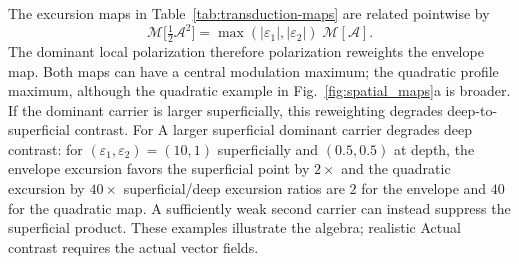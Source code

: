 \documentclass[11pt,a4paper]{article}
\providecommand{\DIFaddtex}[1]{{\protect\color{blue} \sf #1}} %
\providecommand{\DIFdeltex}[1]{{\protect\color{red} \scriptsize #1}} %
\providecommand{\DIFaddbegin}{} %
\providecommand{\DIFaddend}{} %
\providecommand{\DIFdelbegin}{} %
\providecommand{\DIFdelend}{} %
\providecommand{\DIFadd}[1]{\texorpdfstring{\DIFaddtex{#1}}{#1}} %
\providecommand{\DIFdel}[1]{\texorpdfstring{\DIFdeltex{#1}}{}} %
\begin{document}
The excursion maps in Table~\ref{tab:transduction-maps} are related pointwise by
\begin{equation}
\mathcal{M}\big[\tfrac12\mathcal A^2\big]=\max(|\varepsilon_1|,|\varepsilon_2|)\;\mathcal{M}[\mathcal A].
\label{eq:reweight}
\end{equation}
The dominant \DIFdelbegin \DIFdel{local polarization therefore }\DIFdelend \DIFaddbegin \DIFadd{polarization }\DIFaddend reweights the envelope map. Both maps can have a
central \DIFdelbegin \DIFdel{modulation maximum; the quadratic profile }\DIFdelend \DIFaddbegin \DIFadd{maximum, although the quadratic example }\DIFaddend in Fig.~\ref{fig:spatial_maps}a
is broader. \DIFdelbegin \DIFdel{If the dominant carrier is larger
superficially, this reweighting degrades deep-to-superficial contrast. For
}\DIFdelend \DIFaddbegin \DIFadd{A larger superficial dominant carrier degrades deep contrast:
for }\DIFaddend $(\varepsilon_1,\varepsilon_2)=(10,1)$ superficially and $(0.5,0.5)$
at depth, the \DIFdelbegin \DIFdel{envelope excursion favors the superficial point by $2\times$ and the
quadratic excursion by $40\times$}\DIFdelend \DIFaddbegin \DIFadd{superficial/deep excursion ratios are $2$ for the envelope
and $40$ for the quadratic map}\DIFaddend . A sufficiently weak second carrier can
instead suppress the superficial product. \DIFdelbegin \DIFdel{These examples illustrate the
algebra; realistic }\DIFdelend \DIFaddbegin \DIFadd{Actual }\DIFaddend contrast requires the
\DIFdelbegin \DIFdel{actual }\DIFdelend vector fields.
\end{document}
